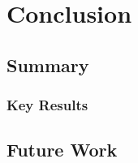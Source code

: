 
\chapter{Conclusion} %

\label{Chapter6} %



\section{Summary}
\subsection{Key Results}
\section{Future Work}